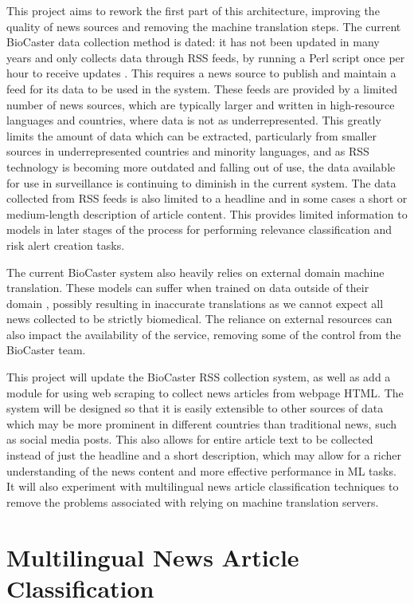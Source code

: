 \documentclass{l4proj}
\begin{document}
This project aims to rework the first part of this architecture, improving the quality of news sources and removing the machine translation steps. The current BioCaster data collection method is dated: it has not been updated in many years and only collects data through RSS feeds, by running a Perl script once per hour to receive updates \citep{collier2008biocaster}. This requires a news source to publish and maintain a feed for its data to be used in the system. These feeds are provided by a limited number of news sources, which are typically larger and written in high-resource languages and countries, where data is not as underrepresented. This greatly limits the amount of data which can be extracted, particularly from smaller sources in underrepresented countries and minority languages, and as RSS technology is becoming more outdated and falling out of use, the data available for use in surveillance is continuing to diminish in the current system. The data collected from RSS feeds is also limited to a headline and in some cases a short or medium-length description of article content. This provides limited information to models in later stages of the process for performing relevance classification and risk alert creation tasks. \par
The current BioCaster system also heavily relies on external domain machine translation. These models can suffer when trained on data outside of their domain \citep{koehn2017six}, possibly resulting in inaccurate translations as we cannot expect all news collected to be strictly biomedical. The reliance on external resources can also impact the availability of the service, removing some of the control from the BioCaster team. \par
This project will update the BioCaster RSS collection system, as well as add a module for using web scraping to collect news articles from webpage HTML. The system will be designed so that it is easily extensible to other sources of data which may be more prominent in different countries than traditional news, such as social media posts. This also allows for entire article text to be collected instead of just the headline and a short description, which may allow for a richer understanding of the news content and more effective performance in ML tasks. It will also experiment with multilingual news article classification techniques to remove the problems associated with relying on machine translation servers.

\section{Multilingual News Article Classification}
\end{document}
